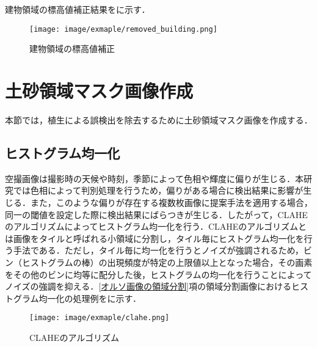       建物領域の標高値補正結果をに示す．

      \begin{figure}[tbp]
        \centering
        \texttt{[image: image/exmaple/removed\_building.png]}
        \caption{建物領域の標高値補正}
        \label{建物領域の標高値補正結果}
      \end{figure}



  \section{土砂領域マスク画像作成}
    \label{土砂領域マスク画像作成}
    本節では，植生による誤検出を除去するために土砂領域マスク画像を作成する．


    \subsection{ヒストグラム均一化}
      空撮画像は撮影時の天候や時刻，季節によって色相や輝度に偏りが生じる．本研究では色相によって判別処理を行うため，偏りがある場合に検出結果に影響が生じる．また，このような偏りが存在する複数枚画像に提案手法を適用する場合，同一の閾値を設定した際に検出結果にばらつきが生じる．したがって，CLAHEのアルゴリズム\cite{CLAHEのアルゴリズム}によってヒストグラム均一化を行う．CLAHEのアルゴリズムとは画像をタイルと呼ばれる小領域に分割し，タイル毎にヒストグラム均一化を行う手法である．ただし，タイル毎に均一化を行うとノイズが強調されるため，ビン（ヒストグラムの棒）の出現頻度が特定の上限値以上となった場合，その画素をその他のビンに均等に配分した後，ヒストグラムの均一化を行うことによってノイズの強調を抑える．\ref{オルソ画像の領域分割}項の領域分割画像におけるヒストグラム均一化の処理例をに示す．

      \begin{figure}[tbp]
        \centering
        \texttt{[image: image/exmaple/clahe.png]}
        \caption{CLAHEのアルゴリズム}
        \label{CLAHEのアルゴリズム結果}
      \end{figure}


